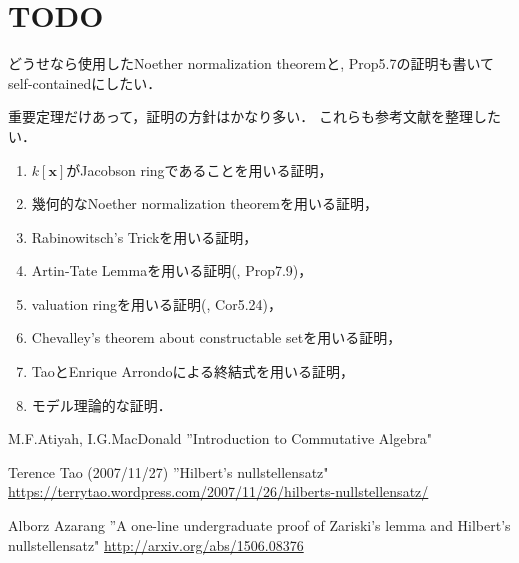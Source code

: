 \documentclass[a4paper]{jsarticle}
\begin{document}
\section{TODO}
    どうせなら使用したNoether normalization theoremと\cite{atimac}, 
    Prop5.7の証明も書いてself-containedにしたい．

    重要定理だけあって，証明の方針はかなり多い．
    これらも参考文献を整理したい．
    \begin{enumerate}
        \item $k[\mathbf{x}]$がJacobson ringであることを用いる証明，
        \item 幾何的なNoether normalization theoremを用いる証明，
        \item Rabinowitsch's Trickを用いる証明，
        \item Artin-Tate Lemmaを用いる証明(\cite{atimac}, Prop7.9)，
        \item valuation ringを用いる証明(\cite{atimac}, Cor5.24)，
        \item Chevalley's theorem about constructable setを用いる証明，
        \item TaoとEnrique Arrondoによる終結式を用いる証明，
        \item モデル理論的な証明．
    \end{enumerate}

\begin{thebibliography}{9}
        M.F.Atiyah, I.G.MacDonald
        ''Introduction to Commutative Algebra"

        Terence Tao (2007/11/27)
        ''Hilbert’s nullstellensatz"
        \url{https://terrytao.wordpress.com/2007/11/26/hilberts-nullstellensatz/}

        Alborz Azarang
        ''A one-line undergraduate proof of Zariski's lemma and Hilbert's nullstellensatz"
        \url{http://arxiv.org/abs/1506.08376}
\end{thebibliography}
\end{document}
